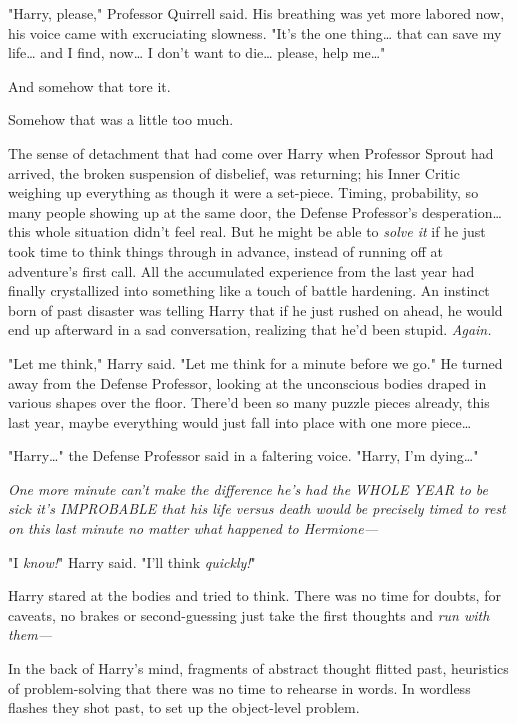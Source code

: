 "Harry, please," Professor Quirrell said. His breathing was yet more labored 
now, his voice came with excruciating slowness. "It's the one thing{\ldots} 
that can save my life{\ldots} and I find, now{\ldots} I don't want to 
die{\ldots} please, help me{\ldots}"

And somehow that tore it.

Somehow that was a little too much.

The sense of detachment that had come over Harry when Professor Sprout had 
arrived, the broken suspension of disbelief, was returning; his Inner Critic 
weighing up everything as though it were a set-piece. Timing, probability, so 
many people showing up at the same door, the Defense Professor's 
desperation{\ldots} this whole situation didn't feel real. But he might be able 
to \emph{solve it} if he just took time to think things through in advance, 
instead of running off at adventure's first call. All the accumulated 
experience from the last year had finally crystallized into something like a 
touch of battle hardening. An instinct born of past disaster was telling Harry 
that if he just rushed on ahead, he would end up afterward in a sad 
conversation, realizing that he'd been stupid. \emph{Again.}

"Let me think," Harry said. "Let me think for a minute before we go." He turned 
away from the Defense Professor, looking at the unconscious bodies draped in 
various shapes over the floor. There'd been so many puzzle pieces already, this 
last year, maybe everything would just fall into place with one more 
piece{\ldots}

"Harry{\ldots}" the Defense Professor said in a faltering voice. "Harry, I'm 
dying{\ldots}"

\emph{One more minute can't make the difference he's had the WHOLE YEAR to be 
sick it's IMPROBABLE that his life versus death would be precisely timed to 
rest on this last minute no matter what happened to Hermione---}

"I \emph{know!}" Harry said. "I'll think \emph{quickly!}"

Harry stared at the bodies and tried to think. There was no time for doubts, 
for caveats, no brakes or second-guessing just take the first thoughts and 
\emph{run with them---}

In the back of Harry's mind, fragments of abstract thought flitted past, 
heuristics of problem-solving that there was no time to rehearse in words. In 
wordless flashes they shot past, to set up the object-level problem.

